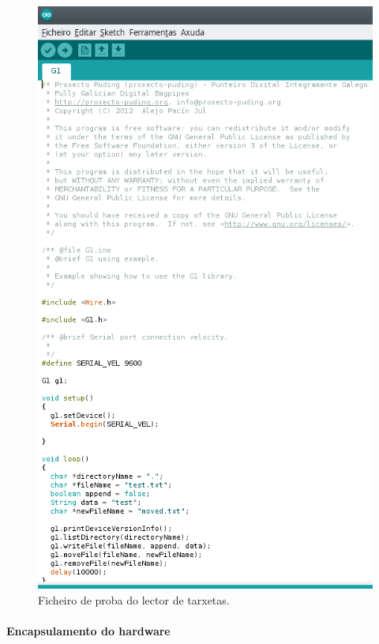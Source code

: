    \begin{figure}[htbp]
    \centering
    \includegraphics[scale=0.8,keepaspectratio=true]{./imagenes/test-lector-tarxetas.png}
    \caption{Ficheiro de proba do lector de tarxetas.}
    \label{figura:TestLectorTarxetas}
   \end{figure}

   \paragraph{Encapsulamento do hardware}\mbox{}\\
   
